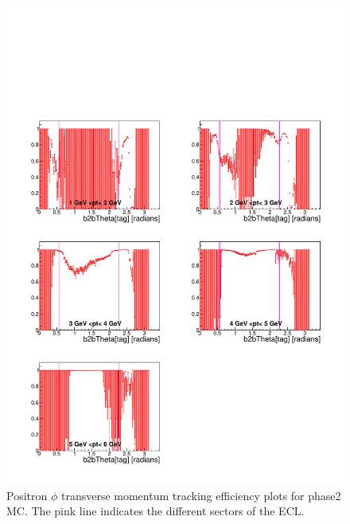 \documentclass[a4paper,11pt,twosided,final,german,openbib,pdftex,listof=totoc,bibliography=totoc]{scrbook}
\begin{document}
\begin{appendix}
\begin{figure}[!htbp]
	\centering
	\includegraphics[width=\textwidth]{Plots/master/xPtMThetaep_MC}
	\caption[Transverse Momentum $\theta$ Positron Efficiency Phase2 MC]{Positron $\phi$ transverse momentum tracking efficiency plots for phase2 MC. The pink line indicates the different sectors of the ECL.}
	\label{plt:PtMThetaep_MC}
\end{figure}



\end{appendix}
\end{document}

